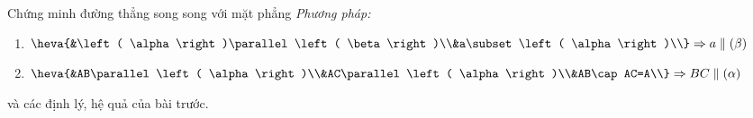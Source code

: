 \begin{dang}{Chứng minh đường thẳng song song với mặt phẳng}		
	{\it Phương pháp:}
	\begin{enumerate}
		\item $\heva{&\left( \alpha  \right)\parallel \left( \beta  \right)\\&a\subset \left( \alpha  \right)\\}\Rightarrow a\parallel \left( \beta  \right)$
		\item $\heva{&AB\parallel \left( \alpha  \right)\\&AC\parallel \left( \alpha  \right)\\&AB\cap AC=A\\}\Rightarrow BC\parallel \left( \alpha  \right)$
	\end{enumerate}
	và các định lý, hệ quả của bài trước.
\end{dang}
